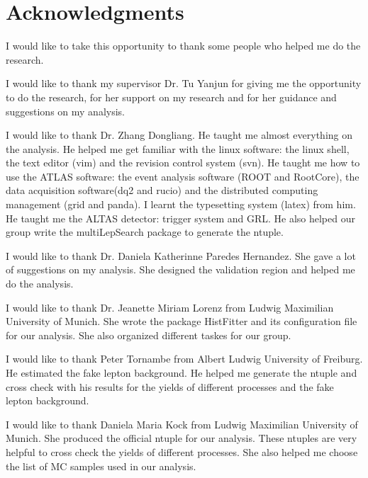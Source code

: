 
\chapter*{Acknowledgments}

I would like to take this opportunity to thank some people who helped me do the research.

I would like to thank my supervisor Dr. Tu Yanjun for giving me the opportunity to do the research, for her support on my research and for her guidance and suggestions on my analysis.

I would like to thank Dr. Zhang Dongliang.
He taught me almost everything on the analysis.
He helped me get familiar with the linux software: the linux shell, the text editor (vim) and the revision control system (svn).
He taught me how to use the ATLAS software: the event analysis software (ROOT and RootCore), the data acquisition software(dq2 and rucio) and the distributed computing management (grid and panda).
I learnt the typesetting system (latex) from him.
He taught me the ALTAS detector: trigger system and GRL.
He also helped our group write the multiLepSearch package to generate the ntuple.

I would like to thank Dr. Daniela Katherinne Paredes Hernandez.
She gave a lot of suggestions on my analysis.
She designed the validation region and helped me do the analysis.

I would like to thank Dr. Jeanette Miriam Lorenz from Ludwig Maximilian University of Munich.
She wrote the package HistFitter and its configuration file for our analysis.
She also organized different taskes for our group.

I would like to thank Peter Tornambe from Albert Ludwig University of Freiburg.
He estimated the fake lepton background.
He helped me generate the ntuple and cross check with his results for the yields of different processes and the fake lepton background.

I would like to thank Daniela Maria Kock from Ludwig Maximilian University of Munich.
She produced the official ntuple for our analysis.
These ntuples are very helpful to cross check the yields of different processes.
She also helped me choose the list of MC samples used in our analysis.

